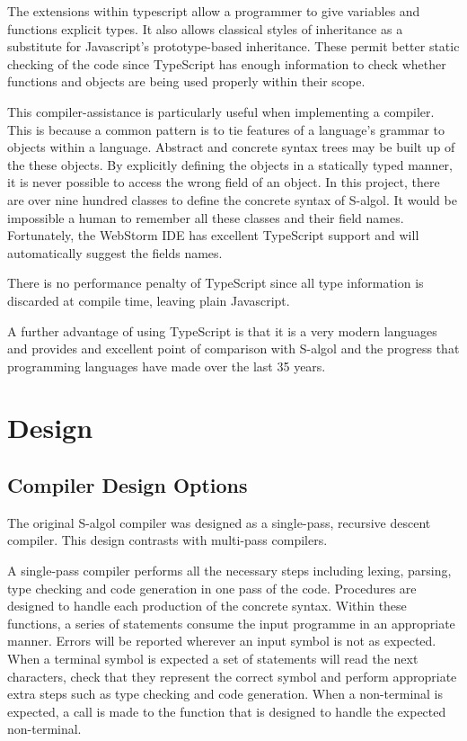 \documentclass{article}
\begin{document}
The extensions within typescript allow a programmer to give variables and functions explicit types. It also allows classical styles of inheritance as a substitute for Javascript's prototype-based inheritance. These permit better static checking of the code since TypeScript has enough information to check whether functions and objects are being used properly within their scope.

This compiler-assistance is particularly useful when implementing a compiler. This is because a common pattern is to tie features of a language's grammar to objects within a language. Abstract and concrete syntax trees may be built up of the these objects. By explicitly defining the objects in a statically typed manner, it is never possible to access the wrong field of an object. In this project, there are over nine hundred classes to define the concrete syntax of S-algol. It would be impossible a human to remember all these classes and their field names. Fortunately, the WebStorm IDE has excellent TypeScript support and will automatically suggest the fields names.

There is no performance penalty of TypeScript since all type information is discarded at compile time, leaving plain Javascript.

A further advantage of using TypeScript is that it is a very modern languages and provides and excellent point of comparison with S-algol and the progress that programming languages have made over the last 35 years. 
\section{Design}


\subsection{Compiler Design Options}

The original S-algol compiler was designed as a single-pass, recursive descent compiler. This design contrasts with multi-pass compilers.

A single-pass compiler performs all the necessary steps including lexing, parsing, type checking and code generation in one pass of the code. Procedures are designed to handle each production of the concrete syntax. Within these functions, a series of statements consume the input programme in an appropriate manner. Errors will be reported wherever an input symbol is not as expected. When a terminal symbol is expected a set of statements will read the next characters, check that they represent the correct symbol and perform appropriate extra steps such as type checking and code generation. When a non-terminal is expected, a call is made to the function that is designed to handle the expected non-terminal.
\end{document}
